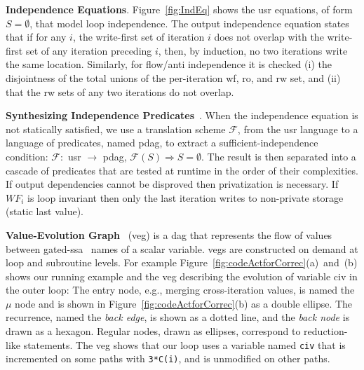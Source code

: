 \documentclass[10pt,nocopyrightspace]{sigplanconf}
\begin{document}
\vspace{1ex}

{\bf Independence Equations}. Figure~\ref{fig:IndEq} shows the {\sc usr}
equations, of form $S=\emptyset$, that model loop independence. 
The output independence equation
states that if for any $i$, the write-first set of iteration $i$
does not overlap with the write-first set of any iteration preceding
$i$, then, by induction, no two  iterations write the same 
location. Similarly, for flow/anti independence it is checked 
(i) the disjointness of the total unions of the per-iteration {\sc wf}, 
{\sc ro}, and {\sc rw} set, and (ii) that the {\sc rw} sets of any two 
iterations do not overlap.

\vspace{1ex}

{\bf Synthesizing Independence Predicates}~\cite{CosPLDI,SummaryMonot}.  
When the independence equation
is not statically satisfied, we use a translation scheme $\mathcal{F}$,
from the {\sc usr} language to a language of 
predicates, named {\sc pdag}, to extract a sufficient-independence condition: 
$\mathcal{F} : $ {\sc usr} $\rightarrow$ {\sc pdag},  
$\mathcal{F}(S) \Rightarrow S = \emptyset$. The result is then separated
into a cascade of predicates that are tested at runtime in the order of 
their complexities.  
If output dependencies cannot be disproved then privatization is
necessary. If $WF_i$ is loop invariant then only the last iteration 
writes to non-private storage (static last value).

\vspace{1ex}

{\bf Value-Evolution Graph}~\cite{VEG} ({\sc veg}) is a {\sc dag}  
that represents the flow of values between gated-{\sc ssa}~\cite{GatedSSA} names 
of a scalar variable.  
%
{\sc veg}s are constructed on demand at loop and subroutine levels.
For example Figure~\ref{fig:codeActforCorrec}(a)~and~(b) shows 
our running example and the {\sc veg} describing the evolution of
variable {\sc civ} in the outer loop: 
%
The entry node, e.g., merging cross-iteration values,  is named 
the $\mu$ node and is shown in Figure~\ref{fig:codeActforCorrec}(b) 
as a double ellipse. The recurrence, named the {\em back edge}, 
is shown as a dotted line, and the {\em back node} is drawn as a hexagon.
%
Regular nodes, drawn as ellipses, correspond to reduction-like 
statements. The {\sc veg} shows that our loop 
uses a variable named {\tt civ} that is incremented on some 
paths with {\tt 3*C(i)}, and is unmodified on other paths. 
\end{document}
